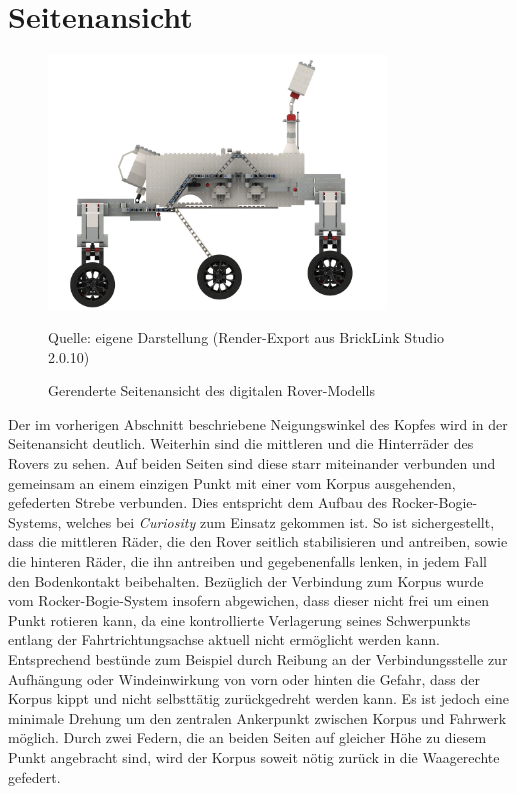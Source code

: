 \section{Seitenansicht}
\label{sec:seitenansicht}

\begin{figure}
	\centering
	\includegraphics[width=0.8\textwidth]{../Images/20200429_Mars_Rover_V5_side.png}
	\vspace{0.5em}
	\parbox[c]{0.8\linewidth}{\footnotesize
		\centering
		\vspace{1em}
		Quelle: eigene Darstellung (Render-Export aus BrickLink Studio 2.0.10)
	}
	\caption{Gerenderte Seitenansicht des digitalen Rover-Modells}
	\label{fig:roversiderender}
\end{figure}

Der im vorherigen Abschnitt beschriebene Neigungswinkel des Kopfes wird in der Seitenansicht deutlich.
Weiterhin sind die mittleren und die Hinterräder des Rovers zu sehen.
Auf beiden Seiten sind diese starr miteinander verbunden und gemeinsam an einem einzigen Punkt mit einer vom Korpus ausgehenden, gefederten Strebe verbunden.
Dies entspricht dem Aufbau des Rocker-Bogie-Systems, welches bei \textit{Curiosity} zum Einsatz gekommen ist.
So ist sichergestellt, dass die mittleren Räder, die den Rover seitlich stabilisieren und antreiben, sowie die hinteren Räder, die ihn antreiben und gegebenenfalls lenken, in jedem Fall den Bodenkontakt beibehalten.
Bezüglich der Verbindung zum Korpus wurde vom Rocker-Bogie-System insofern abgewichen, dass dieser nicht frei um einen Punkt rotieren kann, da eine kontrollierte Verlagerung seines Schwerpunkts entlang der Fahrtrichtungsachse aktuell nicht ermöglicht werden kann.
Entsprechend bestünde zum Beispiel durch Reibung an der Verbindungsstelle zur Aufhängung oder Windeinwirkung von vorn oder hinten die Gefahr, dass der Korpus kippt und nicht selbsttätig zurückgedreht werden kann.
Es ist jedoch eine minimale Drehung um den zentralen Ankerpunkt zwischen Korpus und Fahrwerk möglich. 
Durch zwei Federn, die an beiden Seiten auf gleicher Höhe zu diesem Punkt angebracht sind, wird der Korpus soweit nötig zurück in die Waagerechte gefedert.

